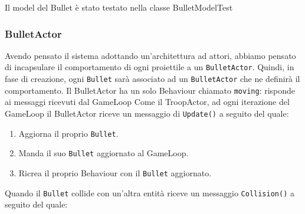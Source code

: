 Il model del Bullet è stato testato nella classe BulletModelTest

\subsubsection{BulletActor}
Avendo pensato il sistema adottando un'architettura ad attori, abbiamo pensato di incapsulare il comportamento
di ogni proiettile a un \texttt{BulletActor}. Quindi, in fase di creazione, ogni \texttt{Bullet} sarà associato ad un
\texttt{BulletActor} che ne definirà il comportamento.
Il BulletActor ha un solo Behaviour chiamato \texttt{moving}: risponde ai messaggi ricevuti dal GameLoop
Come il TroopActor, ad ogni iterazione del GameLoop il BulletActor riceve un messaggio di \texttt{Update()} a seguito del quale:
\begin{enumerate}
    \item Aggiorna il proprio \texttt{Bullet}.
    \item Manda il suo \texttt{Bullet} aggiornato al GameLoop.
    \item Ricrea il proprio Behaviour con il \texttt{Bullet} aggiornato.
\end{enumerate}
Quando il \texttt{Bullet} collide con un'altra entità riceve un messaggio \texttt{Collision()} a seguito del quale:
